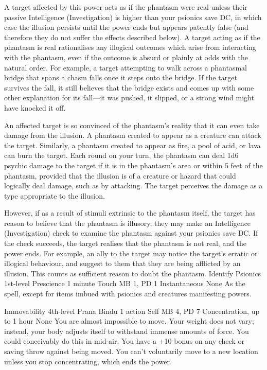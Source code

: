 A target affected by this power acts as if the phantasm were real
unless their passive Intelligence (Investigation) is higher
than your psionics save DC,
in which case the illusion persists until the power ends
but appears patently false
(and therefore they do not suffer the effects described below).
A target acting as if the phantasm is real rationalises any illogical
outcomes which arise from interacting with the phantasm,
even if the outcome is absurd or plainly at odds with the natural order.
For example, a target attempting to walk across a phantasmal bridge
that spans a chasm falls once it steps onto the bridge.
If the target survives the fall, it still believes that the bridge exists
and comes up with some other explanation for its fall---it was pushed,
it slipped, or a strong wind might have knocked it off.

An affected target is so convinced of the phantasm's reality
that it can even take damage from the illusion.
A phantasm created to appear as a creature can attack the target.
Similarly, a phantasm created to appear as fire, a pool of acid,
or lava can burn the target. Each round on your turn,
the phantasm can deal 1d6 psychic damage to the target
if it is in the phantasm's area or within 5 feet of the phantasm,
provided that the illusion is of a creature or hazard
that could logically deal damage, such as by attacking.
The target perceives the damage as a type appropriate to the illusion.

However, if as a result of stimuli extrinsic to the phantasm itself,
the target has reason to believe that the phantasm is illusory, 
they may make an Intelligence (Investigation) check to examine the phantasm
against your psionics save DC.
If the check succeeds, the target realises that the phantasm is not real,
and the power ends.
For example, an ally to the target may notice the target's erratic or
illogical behaviour, and suggest to them that they are being afflicted
by an illusion. This counts as sufficient reason to doubt the phantasm.
\DndPowerHeader%
    {Identify Psionics\label{pwr:identify-psionics}}
    {1st-level Prescience}
    {1 minute}
    {Touch}
    {MB 1, PD 1}
    {Instantaneous}
    {None}
As the  spell, except for
items imbued with psionics and creatures manifesting powers.

\DndPowerHeader%
    {Immovability\label{pwr:immovability}}
    {4th-level Prana Bindu}
    {1 action}
    {Self}
    {MB 4, PD 7}
    {Concentration, up to 1 hour}
    {None}
You are almost impossible to move.
Your weight does not vary;
instead, your body adjusts itself to withstand immense amounts
of force. You could conceivably do this in mid-air. You have
a +10 bonus on any check or saving throw against being moved.
You can't voluntarily move to a new location unless you stop
concentrating, which ends the power.


